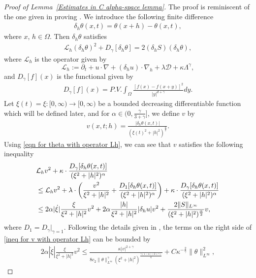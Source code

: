 \documentclass[reqno]{amsart}%
\theoremstyle{definition}
\theoremstyle{remark}
\numberwithin{equation}{section}
\newcommand{\Dh}{\delta_{h}}
\newcommand{\dt}{\partial_t}
\newcommand{\1}{\mathbf{1}}
\newcommand{\Lh}{\mathcal{L}_{h}}
\numberwithin{equation}{section}
\numberwithin{theorem}{section}
\numberwithin{figure}{section}
\begin{document}
\begin{proof}[Proof of Lemma~\ref{Estimates in C alpha-space lemma}]
The proof is reminiscent of the one given in proving \cite[Lemma~6.3]{FS21}. We introduce the following finite difference
\begin{align*}
\Dh\theta(x,t)=\theta(x+h)-\theta(x,t),
\end{align*}
where $x$, $h\in\Omega$. Then $\Dh\theta$ satisfies
\begin{align}\label{eqn for theta with operator Lh}
\Lh(\Dh\theta)^2+D_{\gamma}[\Dh\theta]=2(\delta_h S)(\delta_h \theta),
\end{align}
where $\Lh$ is the operator given by $$\Lh:=\dt+u\cdot\nabla+(\Dh u)\cdot\nabla_h+\lambda\mathcal{D}+\kappa\Lambda^\gamma,$$ and $D_{\gamma}[f](x)$ is the functional given by
\begin{align}\label{def of functional D gamma []}
D_{\gamma}[f](x)=P.V.\int_{\Omega}\frac{[f(x)-f(x+y)]^2}{|y|^{d+\gamma}}dy.
\end{align}
Let $\xi(t)=\xi:[0,\infty)\to[0,\infty)$ be a bounded decreasing differentiable function which will be defined later, and for $\alpha\in(0,\frac{\gamma}{3+\gamma}]$, we define $v$ by
\begin{align*}
v(x,t;h)=\frac{|\Dh\theta(x,t)|}{(\xi(t)^2+|h|^2)^\frac{\alpha}{2}}.
\end{align*}
Using \eqref{eqn for theta with operator Lh}, we can see that $v$ satisfies the following inequality
\begin{align}\label{ineq for v with operator Lh}
&\Lh v^2+\kappa\cdot\frac{D_{\gamma}[\Dh\theta(x,t)]}{(\xi^2+|h|^2)^\alpha}\notag\\
&\le\Lh v^2+\lambda\cdot\left(\frac{v^2}{\xi^2+|h|^2}+\frac{D_{1}[\Dh\theta(x,t)]}{(\xi^2+|h|^2)^\alpha}\right)+\kappa\cdot\frac{D_{\gamma}[\Dh\theta(x,t)]}{(\xi^2+|h|^2)^\alpha}\notag\\
&\le 2\alpha|\dot{\xi}|\frac{\xi}{\xi^2+|h|^2}v^2+2\alpha\frac{|h|}{\xi^2+|h|^2}|\Dh u|v^2+\frac{2\|S\|_{L^\infty}}{(\xi^2+|h|^2)^\frac{\alpha}{2}}v,
\end{align}
where $D_{1}=D_{\gamma}|_{\gamma=1}$. Following the details given in \cite{FS21}, the terms on the right side of \eqref{ineq for v with operator Lh} can be bounded by
\begin{align}\label{bound on the term with derivative on xi}
2\alpha|\dot{\xi}|\frac{\xi}{\xi^2+|h|^2}v^2\le \frac{\kappa|v|^{2+\gamma}}{8c_2\|\theta\|^\gamma_{L^\infty}(\xi^2+|h|^2)^\frac{\gamma(1-\alpha)(2+\gamma)}{6}}+C\kappa^{-\frac{2}{\gamma}}\|\theta\|^2_{L^\infty},

\end{align}
\end{proof}
\end{document}
